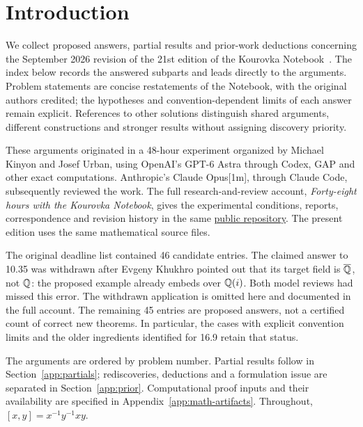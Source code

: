 \section{Introduction}
We collect proposed answers, partial results and prior-work deductions
concerning the September 2026 revision of the 21st edition of the
Kourovka Notebook~\cite{kourovka21}. The index below records the answered
subparts and leads directly to the arguments. Problem statements are
concise restatements of the Notebook, with the original authors credited;
the hypotheses and convention-dependent limits of each answer remain
explicit. References to other solutions distinguish shared arguments,
different constructions and stronger results without assigning discovery
priority.

These arguments originated in a 48-hour experiment organized by Michael
Kinyon and Josef Urban, using OpenAI's GPT-6 Astra through Codex, GAP and
other exact computations. Anthropic's Claude Opus[1m], through Claude Code,
subsequently reviewed the work. The full research-and-review account,
\emph{Forty-eight hours with the Kourovka Notebook}, gives the experimental
conditions, reports, correspondence and revision history in the same
\href{https://github.com/JUrban/kour1}{public repository}.
The present edition uses the same mathematical source files.

The original deadline list contained 46 candidate entries. The claimed
answer to 10.35 was withdrawn after Evgeny Khukhro pointed out that its
target field is $\overline{\mathbb Q}$, not $\mathbb Q$: the proposed example already
embeds over $\mathbb Q(i)$. Both model reviews had missed this error. The
withdrawn application is omitted here and documented in the full account.
The remaining 45 entries are proposed answers, not a certified count of
correct new theorems. In particular, the cases with explicit convention
limits and the older ingredients identified for 16.9 retain that status.

The arguments are ordered by problem number. Partial results follow in
Section~\ref{app:partials}; rediscoveries, deductions and a formulation
issue are separated in Section~\ref{app:prior}. Computational proof inputs
and their availability are specified in Appendix~\ref{app:math-artifacts}.
Throughout, $[x,y]=x^{-1}y^{-1}xy$.
